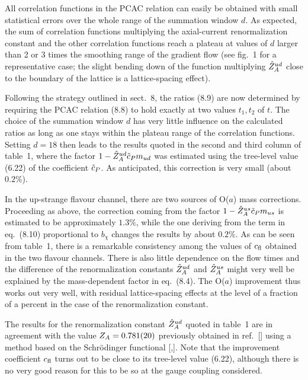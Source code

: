 All correlation functions in the PCAC relation
can easily be obtained with small statistical errors over
the whole range of the summation window $d$.
As expected, the sum of correlation functions multiplying
the axial-current renormalization constant and the other
correlation functions reach a plateau
at values of $d$ larger than 2 or 3 times the smoothing range 
of the gradient flow (see fig.~1 for a representative case;
the slight bending down of the 
function multiplying $\hat{Z}_A^{ud}$ close to the 
boundary of the lattice is a lattice-spacing effect).

Following the strategy outlined in sect.~8, the ratios (8.9)
are now determined by requiring the PCAC relation (8.8) to hold exactly 
at two values $t_1,t_2$ of $t$.
The choice of the summation window $d$ has very little influence 
on the calculated ratios as long as one stays within
the plateau range of the correlation functions.
Setting $d=18$ then leads to the results
quoted in the second and third column of table~1,
where the factor $1-\hat{Z}_A^{ud}\tilde{c}_P m_{ud}$ was estimated
using the tree-level value (6.22) of the coefficient $\tilde{c}_P$.
As anticipated, this correction is very small (about $0.2\%$).

In the up-strange flavour channel, there are two sources of 
O($a$) mass corrections. Proceeding as above, the correction
coming from the factor $1-\hat{Z}_A^{us}\tilde{c}_P m_{us}$
is estimated to be approximately $1.3\%$, 
while the one deriving from the 
term in eq.~(8.10) proportional to $b_{\chi}$
changes the results by about $0.2\%$.
As can be seen from table~1,
there is a remarkable consistency among the
values of $c_{\rm fl}$ obtained in the two flavour channels.
There is also little dependence on the flow
times and the difference of the renormalization constants
$\hat{Z}_A^{ud}$ and $\hat{Z}_A^{us}$ might very well be explained by
the mass-dependent factor in eq.~(8.4). The O($a$) improvement
thus works out very well, with residual 
lattice-spacing effects at the level of a fraction of a percent 
in the case of the renormalization constant.



The results for the renormalization constant 
$\hat{Z}_A^{ud}$ quoted in table~1 are in agreement
with the value $Z_A=0.781(20)$ previously
obtained in ref.~[\cite{AokiEtAlIV}]
using a method based on the Schr\"odinger functional
[\cite{ZASFI},\cite{ZASFII}]. Note that the improvement coefficient 
$c_{\rm fl}$ turns out to be close to its tree-level value (6.22),
although there is no very good reason for this to be so
at the gauge coupling considered.

